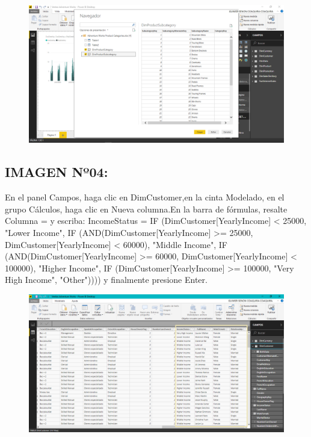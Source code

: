 \begin{figure}[httb]
\begin{center}
\includegraphics[width=13cm]{./Imagenes/Captura04}
\end{center}
\end{figure}



\subsection{IMAGEN Nº04:}
\begin{itemize}
En el panel Campos, haga clic en DimCustomer,en la cinta Modelado, en el grupo Cálculos, haga clic en Nueva columna.En la barra de fórmulas, resalte Columna = y escriba:
IncomeStatus = IF (DimCustomer[YearlyIncome] < 25000, "Lower Income",
IF (AND(DimCustomer[YearlyIncome] >= 25000, DimCustomer[YearlyIncome] < 60000),
"Middle Income",
IF (AND(DimCustomer[YearlyIncome] >= 60000, DimCustomer[YearlyIncome] < 100000),
"Higher Income",
IF (DimCustomer[YearlyIncome] >= 100000, "Very High Income", "Other")))) y finalmente presione Enter.
\end{itemize}

\begin{figure}[httb]
\begin{center}
\includegraphics[width=13cm]{./Imagenes/Captura06}
\end{center}
\end{figure}

